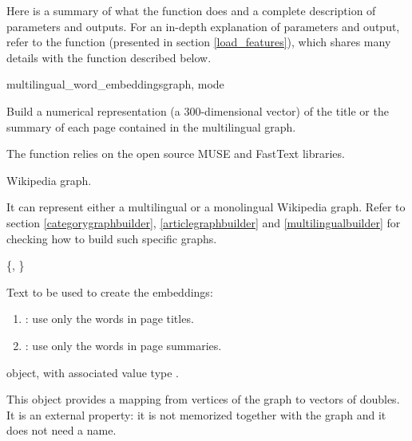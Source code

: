             Here is a summary of what the function does and a complete description of parameters and outputs. For an in-depth explanation of parameters and output, refer to the  function (presented in section \ref{load_features}), which shares many details with the function described below.
            \begin{independentfunctiondoc}{multilingual\_word\_embeddings}{graph, mode}
                \begin{functiondescription}
                    Build a numerical representation (a \(300\)-dimensional vector) of the title or the summary of each page contained in the multilingual graph.
                    
                    The function relies on the open source MUSE and FastText libraries.
                \end{functiondescription}
                
                \begin{functionparameters}
                    \item[graph] 
                    
                    Wikipedia graph.
                    
                    It can represent either a multilingual or a monolingual Wikipedia graph. Refer to section \ref{categorygraphbuilder}, \ref{articlegraphbuilder} and \ref{multilingualbuilder} for checking how to build such specific graphs.
                    \item[mode] \{, \}
                    
                    Text to be used to create the embeddings:
                    \begin{enumerate}
                        \item {}: use only the words in page titles.
                        \item {}: use only the words in page summaries.
                    \end{enumerate}
                \end{functionparameters}
                
                \begin{functionoutput}
                     object, with associated value type .
                    
                    This object provides a mapping from vertices of the graph to vectors of doubles. It is an external property: it is not memorized together with the graph and it does not need a name.
                \end{functionoutput}
            \end{independentfunctiondoc}
